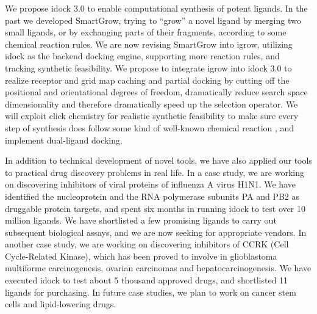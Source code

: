 We propose idock 3.0 to enable computational synthesis of potent ligands. In the past we developed SmartGrow, trying to ``grow'' a novel ligand by merging two small ligands, or by exchanging parts of their fragments, according to some chemical reaction rules. We are now revising SmartGrow into igrow, utilizing idock as the backend docking engine, supporting more reaction rules, and tracking synthetic feasibility. We propose to integrate igrow into idock 3.0 to realize receptor and grid map caching and partial docking by cutting off the positional and orientational degrees of freedom, dramatically reduce search space dimensionality and therefore dramatically speed up the selection operator. We will exploit click chemistry for realistic synthetic feasibility to make sure every step of synthesis does follow some kind of well-known chemical reaction \citep{1051}, and implement dual-ligand docking.

In addition to technical development of novel tools, we have also applied our tools to practical drug discovery problems in real life. In a case study, we are working on discovering inhibitors of viral proteins of influenza A virus H1N1. We have identified the nucleoprotein and the RNA polymerase subunits PA and PB2 as druggable protein targets, and spent six months in running idock to test over 10 million ligands. We have shortlisted a few promising ligands to carry out subsequent biological assays, and we are now seeking for appropriate vendors. In another case study, we are working on discovering inhibitors of CCRK (Cell Cycle-Related Kinase), which has been proved to involve in glioblastoma multiforme carcinogenesis, ovarian carcinomas and hepatocarcinogenesis. We have executed idock to test about 5 thousand approved drugs, and shortlisted 11 ligands for purchasing. In future case studies, we plan to work on cancer stem cells and lipid-lowering drugs.

\chapterend
